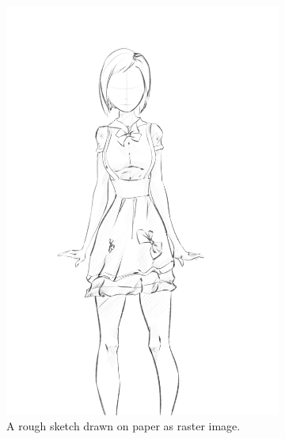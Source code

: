 \begin{figure}[h]
\centering
    \begin{subfigure}{.3\textwidth}
        \includegraphics[width=\textwidth]{graphics/sketchbench/Art_freeform_AG_03.png}
        \caption{A rough sketch drawn on paper as raster image.}
    \end{subfigure}
    \hspace{.01\textwidth}
    \begin{subfigure}{.3\textwidth}

\end{subfigure}
\end{figure}
